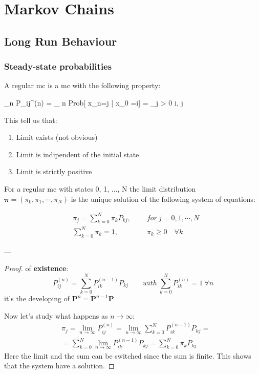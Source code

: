 \chapter{Markov Chains}

\section{Long Run Behaviour}

\subsection{Steady-state probabilities}

	\begin{definition}
		A regular \gls{mc} is a \gls{mc} with the following property:

		\beq \lim_{n \to \infty} P_{ij}^{(n)} = \lim_{ n \to \infty} Prob[ x_n=j | x_0 =i] = \pi_j > 0 \quad \forall i, j \eeq
	\end{definition}

	This tell us that:
	\begin{enumerate}
		\item Limit exists (not obvious)
		\item Limit is indipendent of the initial state
		\item Limit is strictly positive
	\end{enumerate}

	\begin{theorem}
		For a regular \gls{mc} with states 0, 1, ..., N the limit distribution $\bm\pi = (\pi_0,\pi_1,\cdots,\pi_N)$ is the unique solution of the following system of equations:

		\begin{align}
			&\pi_j = \sum_{k=0}^N \pi_k P_{k j} , \qquad ~for ~j = 0,1, \cdots, N \\
			&\sum_{k=0}^N \pi_k = 1, \qquad \qquad \pi_k \ge 0 \quad \forall k
		\end{align}

	\end{theorem}

	---
	\begin{proof} of \textbf{existence}:
		\begin{equation}
  			P_{i j}^{(n)} = \sum_{k=0}^N P_{ik}^{(n-1)} P_{k j}
			\qquad with ~\sum_{k=0}^N P_{ik}^{(n)} = 1 ~\forall n
		\end{equation}
		it's the developing of $\bm P^n = \bm P^{n-1} \bm P$

		Now let's study what happens as $ n \to \infty $:
		\begin{equation}
			\begin{split}
				&\pi_j = \lim_{n \to \infty} P_{ij}^{(n)} = \lim_{n \to \infty} \sum_{k=0}^N P_{ik}^{(n-1)} P_{k j
				} =\\
				&= \sum_{k=0}^N \lim_{n \to \infty} P_{ik}^{(n-1)} P_{k j
				} = \sum_{k=0}^N \pi_k P_{kj}
			\end{split}
		\end{equation}
		Here the limit and the sum can be switched since the sum is finite.
		This shows that the system have a solution.
	\end{proof}
	
